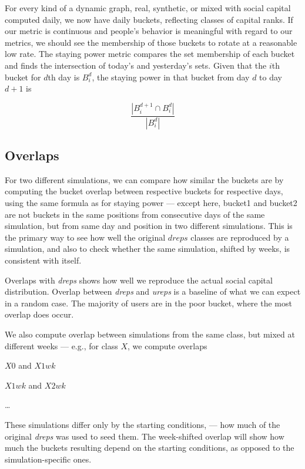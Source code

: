 \documentclass[10pt,oneside]{memoir}
\begin{document}
\begin{Spacing}{2}
\label{section:staying-power}
For every kind of a dynamic graph, real, synthetic, or mixed with social capital computed daily, we now have daily buckets, reflecting classes of capital ranks.  If our metric is continuous and people's behavior is meaningful with regard to our metrics, we should see the membership of those buckets to rotate at a reasonable low rate.  The staying power metric compares the set membership of each bucket and finds the intersection of today's and yesterday's sets.  Given that the $i$th bucket for $d$th day is $B_i^d$, the staying power in that bucket from day $d$ to day $d+1$ is

\[ \frac{|B_i^{d+1} \cap B_i^d|}{|B_i^d|} \]



\subsection{Overlaps}
\label{overlaps}

For two different simulations, we can compare how similar the buckets are by computing the bucket overlap between respective buckets for respective days, using the same formula as for staying power --- except here, bucket1 and bucket2 are not buckets in the same positions from consecutive days of the same simulation,  but from same day and position in two different simulations.  This is the primary way to see how well the original $dreps$ classes are reproduced by a simulation, and also to check whether the same simulation, shifted by weeks, is consistent with itself.


\label{section:overx-dreps}
Overlaps with {\itshape dreps} shows how well we reproduce the actual social capital distribution.  Overlap between {\itshape dreps} and {\itshape ureps} is a baseline of what we can expect in a random case.  The majority of users are in the poor bucket, where the most overlap does occur.


\label{section:overx-self}
We also compute overlap between simulations from the same class, but mixed at different weeks --- e.g., for class $X$, we compute overlaps


$X0$ and $X1wk$


$X1wk$ and $X2wk$


{\ldots}


These simulations differ only by the starting conditions, --- how much of the original {\itshape dreps} was used to seed them.  The week-shifted overlap will show how much the buckets resulting depend on the starting conditions, as opposed to the simulation-specific ones.



\end{Spacing}
\end{document}
